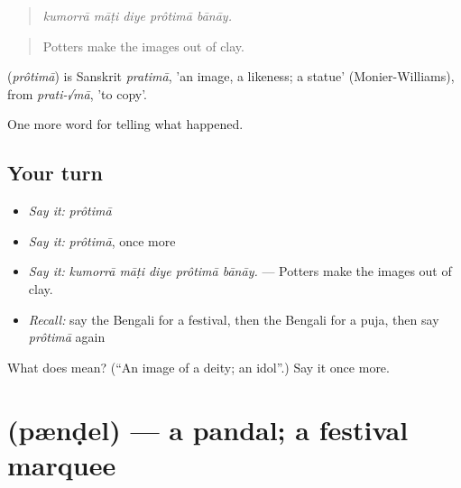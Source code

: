 \begin{quote}
    
\end{quote}

\begin{quote}
\emph{kumorrā māṭi diye prôtimā bānāy.}
\end{quote}

\begin{quote}
Potters make the images out of clay.
\end{quote}

\begin{cousinweb}
\textbf{} (\emph{prôtimā}) is Sanskrit \emph{pratimā}, 'an image, a likeness; a statue' (Monier-Williams), from \emph{prati-√mā}, 'to copy'.
\end{cousinweb}

\begin{grammarlens}[title={What you've built}]
One more word for telling what happened.
\end{grammarlens}

\subsection*{Your turn}
\begin{itemize}
\raggedright
  \item \emph{Say it:} \emph{prôtimā}
  \item \emph{Say it:} \emph{prôtimā}, once more
  \item \emph{Say it:} \emph{kumorrā māṭi diye prôtimā bānāy.} — Potters make the images out of clay.
  \item \emph{Recall:} say the Bengali for a festival, then the Bengali for a puja, then say \emph{prôtimā} again
\end{itemize}

\begin{tcolorbox}[breakable,colback=teal!4,colframe=teal!35!black,title={Before you move on}]
What does  mean? (\textquotedblleft{}An image of a deity; an idol\textquotedblright{}.) Say it once more.
\end{tcolorbox}
\section[\texorpdfstring{\bn{প্যান্ডেল} (pænḍel)}{প্যান্ডেল (pænḍel)}]{ (pænḍel) — a pandal; a festival marquee}

\label{lesson:BN-C304-pendel}




